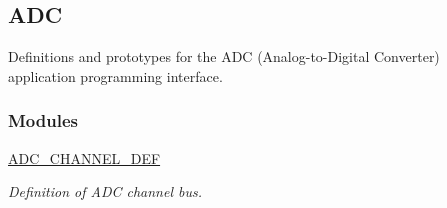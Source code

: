 \hypertarget{group___a_d_c}{}\subsection{A\+DC}
\label{group___a_d_c}


Definitions and prototypes for the A\+DC (Analog-\/to-\/\+Digital Converter) application programming interface.  


\subsubsection*{Modules}
\begin{DoxyCompactItemize}
\item 
\hyperlink{group___a_d_c___c_h_a_n_n_e_l___d_e_f}{A\+D\+C\+\_\+\+C\+H\+A\+N\+N\+E\+L\+\_\+\+D\+EF}
\begin{DoxyCompactList}\small\item\em Definition of A\+DC channel bus. \end{DoxyCompactList}\end{DoxyCompactItemize}

